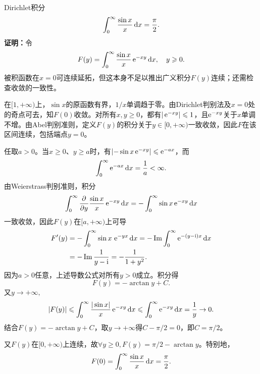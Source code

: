 \begin{example}{Dirichlet积分}{}
	\begin{equation}\label{eq:calc-dirichlet-integral}
		\int_0^\infty\frac{\sin x}x\mathop{}\!\mathrm{d} x = \frac{\pi}2.
	\end{equation}
	\textbf{证明：}令
	\[
		F(y) = \int_0^\infty\frac{\sin x}x\mathop{}\!\mathrm{e}^{-xy}\mathop{}\!\mathrm{d} x,\quad y \geqslant 0.
	\]
	被积函数在$x = 0$可连续延拓，但这本身不足以推出广义积分$F(y)$连续；还需检查收敛的一致性。

	在$[1,+\infty)$上，$\sin x$的原函数有界，$1/x$单调趋于零。由Dirichlet判别法及$x = 0$处的奇点可去，知$F(0)$收敛。对所有$x,y \geqslant 0$，都有$|\mathop{}\!\mathrm{e}^{-xy}| \leqslant 1$，且$\mathop{}\!\mathrm{e}^{-xy}$关于$x$单调不增。由Abel判别准则，定义$F(y)$的积分关于$y \in [0,+\infty)$一致收敛，因此$F$在该区间连续，包括端点$y = 0$。

	任取$a > 0$。当$x \geqslant 0$、$y \geqslant a$时，有$\lvert-\sin x\mathop{}\!\mathrm{e}^{-xy}\rvert \leqslant \mathop{}\!\mathrm{e}^{-ax}$，而
	\[
		\int_0^\infty\mathop{}\!\mathrm{e}^{-ax}\mathop{}\!\mathrm{d} x = \frac1a < \infty.
	\]
	由Weierstrass判别准则，积分
	\[
		\int_0^\infty\frac{\partial^{}}{\partial{y}^{}}\frac{\sin x}x\mathop{}\!\mathrm{e}^{-xy}\mathop{}\!\mathrm{d} x = -\int_0^\infty\sin x\mathop{}\!\mathrm{e}^{-xy}\mathop{}\!\mathrm{d} x
	\]
	一致收敛，因此$F(y)$在$[a,+\infty)$上可导
	\begin{align*}
        F'(y) &= -\int_0^\infty\sin x\,\mathop{}\!\mathrm{e}^{-yx}\mathop{}\!\mathrm{d} x
        = -\operatorname{Im}\int_0^\infty\mathop{}\!\mathrm{e}^{-(y-\mathrm{i})x}\mathop{}\!\mathrm{d} x\\
        &= -\operatorname{Im}\frac1{y - \mathrm{i}} = -\frac1{1 + y^2}.
    \end{align*}
	因为$a > 0$任意，上述导数公式对所有$y > 0$成立。积分得
	\[
		F(y) = -\arctan y + C.
	\]
	又$y \to +\infty,$
	\[
		|F(y)| \leqslant \int_0^\infty\frac{|\sin x|}x\mathop{}\!\mathrm{e}^{-xy}\mathop{}\!\mathrm{d} x \leqslant \int_0^\infty\mathop{}\!\mathrm{e}^{-xy}\mathop{}\!\mathrm{d} x = \frac1y \to 0.
	\]
	结合$F(y) = -\arctan y + C$，取$y \to +\infty$得$C - \pi/2 = 0$，即$C = \pi/2$。

	又$F(y)$在$[0,+\infty)$上连续，故$\forall y \geqslant 0,F(y) = \pi/2 - \arctan y$。特别地，
	\[
		F(0) = \int_0^\infty\frac{\sin x}x\mathop{}\!\mathrm{d} x = \frac{\pi}2.
	\]
\end{example}
\newpage
